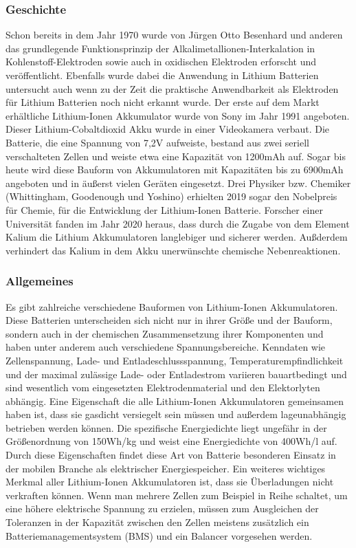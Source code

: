 \subsubsection{Geschichte}
Schon bereits in dem Jahr 1970 wurde von Jürgen Otto Besenhard und anderen das grundlegende Funktionsprinzip der Alkalimetallionen-Interkalation in Kohlenstoff-Elektroden sowie auch in oxidischen Elektroden erforscht und veröffentlicht. Ebenfalls wurde dabei die Anwendung in Lithium Batterien untersucht auch wenn zu der Zeit die praktische Anwendbarkeit als Elektroden für Lithium Batterien noch nicht erkannt wurde. Der erste auf dem Markt erhältliche Lithium-Ionen Akkumulator wurde von Sony im Jahr 1991 angeboten. Dieser Lithium-Cobaltdioxid Akku wurde in einer Videokamera verbaut. Die Batterie, die eine Spannung von 7,2V aufweiste, bestand aus zwei seriell verschalteten Zellen und weiste etwa eine Kapazität von 1200mAh auf. Sogar bis heute wird diese Bauform von Akkumulatoren mit Kapazitäten
bis zu 6900mAh angeboten und in äußerst vielen Geräten eingesetzt. Drei Physiker bzw. Chemiker (Whittingham, Goodenough und Yoshino) erhielten 2019 sogar den Nobelpreis für Chemie, für die Entwicklung der Lithium-Ionen Batterie.
Forscher einer Universität fanden im Jahr 2020 heraus, dass durch die Zugabe von dem Element Kalium die Lithium Akkumulatoren langlebiger und sicherer werden. Außderdem verhindert das Kalium in dem Akku unerwünschte chemische Nebenreaktionen.
\subsubsection{Allgemeines}
Es gibt zahlreiche verschiedene Bauformen von Lithium-Ionen Akkumulatoren. Diese Batterien unterscheiden sich nicht nur in ihrer Größe und der Bauform, sondern auch in der chemischen Zusammensetzung ihrer Komponenten und haben unter anderem auch verschiedene Spannungsbereiche. Kenndaten wie Zellenspannung, Lade- und Entladeschlussspannung, Temperaturempfindlichkeit und der maximal zulässige Lade- oder Entladestrom variieren bauartbedingt und sind wesentlich vom eingesetzten Elektrodenmaterial und den Elektorlyten abhängig. Eine Eigenschaft die alle Lithium-Ionen Akkumulatoren gemeinsamen haben ist, dass sie gasdicht versiegelt sein müssen und außerdem lageunabhängig betrieben werden können. Die spezifische Energiedichte liegt ungefähr in der Größenordnung von 150Wh/kg und weist eine Energiedichte von 400Wh/l auf. Durch diese Eigenschaften findet diese Art von Batterie besonderen Einsatz in der mobilen Branche als elektrischer Energiespeicher. Ein weiteres wichtiges Merkmal aller Lithium-Ionen Akkumulatoren ist, dass sie Überladungen nicht verkraften können. Wenn man mehrere Zellen zum Beispiel in Reihe schaltet, um eine höhere elektrische Spannung zu erzielen, müssen zum Ausgleichen der Toleranzen in der Kapazität zwischen den Zellen meistens zusätzlich ein Batteriemanagementsystem (BMS) und ein Balancer vorgesehen werden.  
\newpage

